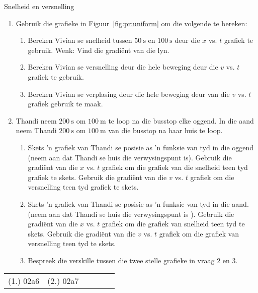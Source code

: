 \begin{exercises}{Snelheid en versnelling}
\begin{enumerate}[noitemsep, label=\textbf{\arabic*}. ] 
\item Gebruik die grafieke in Figuur~\ref{fig:pr:uniform} om die volgende te bereken:
\begin{enumerate}[noitemsep, label=\textbf{\alph*}. ] 
    \item Bereken Vivian se snelheid tussen $50~\text{s}$ en $100~\text{s}$ deur die $x$ vs. $t$ grafiek te gebruik. Wenk: Vind die gradi\"ent van die lyn.
    \item Bereken Vivian se versnelling deur die hele beweging deur die $v$ vs. $t$ grafiek te gebruik.
    \item Bereken Vivian se verplasing deur die hele beweging deur van die $v$ vs. $t$ grafiek gebruik te maak.
\end{enumerate}

\item Thandi neem $200~\text{s}$ om  $100~\text{m}$ te loop na die busstop elke oggend. In die aand neem Thandi $200~\text{s}$ om $100~\text{m}$ van die busstop na haar huis te loop.

\begin{enumerate}[noitemsep, label=\textbf{\alph*}. ] 
    \item  Skets 'n grafiek van Thandi se posisie as 'n funksie van tyd in die oggend (neem aan dat Thandi se huis die verwysingspunt is). Gebruik die gradi\"ent van die $x$ vs. $t$ grafiek om die grafiek van die snelheid teen tyd grafiek te skets. Gebruik die gradi\"ent van die $v$ vs. $t$ grafiek om die versnelling teen tyd grafiek te skets.
    \item  Skets 'n grafiek van Thandi se posisie as 'n funksie van tyd in die aand. (neem aan dat Thandi se huis die verwysingspunt is ). Gebruik die gradi\"ent van die $x$ vs. $t$ grafiek om die grafiek van snelheid teen tyd te skets. Gebruik die gradi\"ent van die $v$ vs. $t$ grafiek om die grafiek van versnelling teen tyd te skets.
    \item Bespreek die verskille tussen die twee stelle grafieke in vraag 2 en 3.
\end{enumerate}
\end{enumerate}

\practiceinfo
\par \begin{tabular}[h]{cccccc}
(1.) 02a6  &  (2.) 02a7  & \end{tabular}
\end{exercises}



